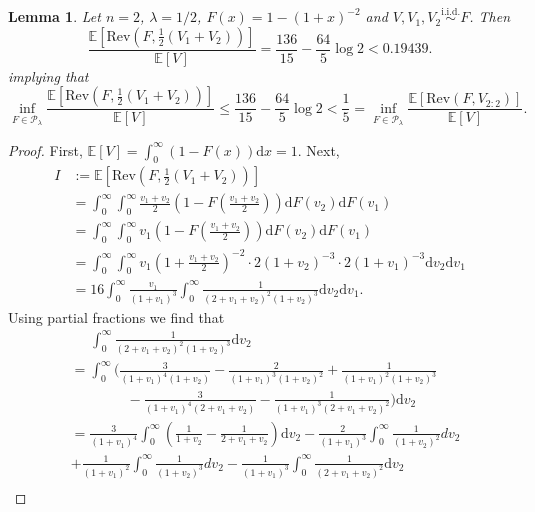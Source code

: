\documentclass[10pt,a4paper]{amsart}
\newtheorem{lemma}{Lemma}
\newcommand{\E}{\mathbb{E}}
\newcommand{\Rev}{\mathrm{Rev}}
\newcommand{\dd}{\mathrm{d}}
\newcommand{\iid}{\overset{\text{i.i.d.}}{\sim}}
\begin{document}
\begin{lemma}
Let $n = 2$, $\lambda = 1/2$, $F(x)=1-(1+x)^{-2}$ and $V,V_1,V_2\iid F$. Then
    $$
    \frac{\E\left[\Rev(F, \frac{1}{2}(V_1+V_2))\right]}{\E[V]}=\frac{136}{15}-\frac{64}{5}\log 2<0.19439.
    $$
    implying that 
    $$
    \inf_{F \in \mathcal{P}_{\lambda}} \frac{\E\left[\Rev(F, \frac{1}{2}(V_1+V_2))\right]}{\E[V]} \leq \frac{136}{15}-\frac{64}{5}\log 2 < \frac{1}{5} = \inf_{F \in \mathcal{P}_{\lambda}} \frac{\E\left[\Rev(F, V_{2:2})\right]}{\E[V]}.
    $$

\end{lemma}

\begin{proof}
    First, $\E[V]=\int_0^\infty(1-F(x))\dd x=1$. Next, 
    \begin{align*}
        I&:=\E\left[\Rev(F, \frac{1}{2}(V_1+V_2))\right]\\&=\int_0^\infty \int_0^\infty\frac{v_1+v_2}{2}\left(1-F\left(\frac{v_1+v_2}{2}\right)\right)\dd F(v_2)\dd F(v_1)\\
        &=\int_0^\infty \int_0^\infty v_1\left(1-F\left(\frac{v_1+v_2}{2}\right)\right)\dd F(v_2)\dd F(v_1)\\
        &=\int_0^\infty \int_0^\infty v_1\left(1+\frac{v_1+v_2}{2}\right)^{-2}\cdot2(1+v_2)^{-3}\cdot2(1+v_1)^{-3}\dd v_2\dd v_1\\
        &=16\int_0^\infty \frac{v_1}{(1+v_1)^3}\int_0^\infty \frac{1}{(2+v_1+v_2)^2(1+v_2)^3}\dd v_2\dd v_1.
    \end{align*}
    Using partial fractions we find that
    \begin{align*}
        &\;\;\;\;\;\int_0^\infty \frac{1}{(2+v_1+v_2)^2(1+v_2)^3}\dd v_2\\&=\int_0^\infty\Bigg(\frac{3}{\left(1+v_{1}\right)^{4}\left(1+v_{2}\right)}-\frac{2}{\left(1+v_{1}\right)^{3}\left(1+v_{2}\right)^{2}}+\frac{1}{\left(1+v_{1}\right)^{2}\left(1+v_{2}\right)^{3}}\\&\qquad\qquad-\frac{3}{\left(1+v_{1}\right)^{4}\left(2+v_{1}+v_{2}\right)}-\frac{1}{\left(1+v_{1}\right)^{3}\left(2+v_{1}+v_{2}\right)^{2}}\Bigg)\dd v_2\\
        &=\frac{3}{(1+v_1)^4}\int_0^\infty\left(\frac{1}{1+v_2}-\frac{1}{2+v_1+v_2}\right)\dd v_2
        -\frac{2}{\left(1+v_{1}\right)^{3}}\int_{0}^{\infty}\frac{1}{\left(1+v_{2}\right)^{2}}dv_{2}\\&+\frac{1}{\left(1+v_{1}\right)^{2}}\int_{0}^{\infty}\frac{1}{\left(1+v_{2}\right)^{3}}dv_{2}-\frac{1}{\left(1+v_{1}\right)^{3}}\int_{0}^{\infty}\frac{1}{\left(2+v_{1}+v_{2}\right)^{2}}\dd v_{2}\\

\end{align*}
\end{proof}
\end{document}

